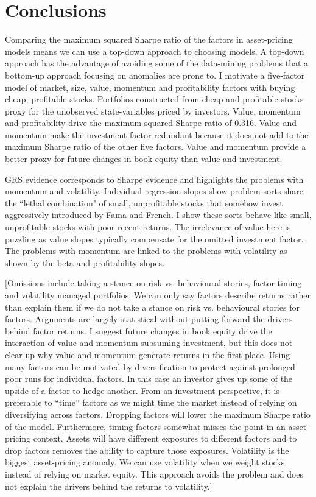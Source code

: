 
\section*{Conclusions}

Comparing the maximum squared Sharpe ratio of the factors in asset-pricing
models means we can use a top-down approach to choosing models.
A top-down approach has the advantage of avoiding some of the data-mining
problems that a bottom-up approach focusing on anomalies are prone to.
I motivate a five-factor model of market, size, value, momentum and
profitability factors with buying cheap, profitable stocks.
Portfolios constructed from cheap and profitable stocks proxy for the
unobserved state-variables priced by investors.
Value, momentum and profitability drive the maximum squared Sharpe ratio of
0.316.
Value and momentum make the investment factor redundant because it does not add
to the maximum Sharpe ratio of the other five factors.
Value and momentum provide a better proxy for future changes in book equity
than value and investment.

GRS evidence corresponds to Sharpe evidence and highlights the problems with
momentum and volatility.
Individual regression slopes show problem sorts share the ``lethal combination"
of small, unprofitable stocks that somehow invest aggressively introduced by
Fama and French.
I show these sorts behave like small, unprofitable stocks with poor recent
returns.
The irrelevance of value here is puzzling as value slopes typically
compensate for the omitted investment factor.
The problems with momentum are linked to the problems with volatility as shown
by the beta and profitability slopes.

[Omissions include taking a stance on risk vs. behavioural stories, factor
timing and volatility managed portfolios. We can only say factors describe
returns rather than explain them if we do not take a stance on risk vs.
behavioural stories for factors. Arguments are largely statistical without
putting forward the drivers behind factor returns. I suggest future changes in
book equity drive the interaction of value and momentum subsuming investment,
but this does not clear up why value and momentum generate returns in the first
place. Using many factors can be motivated by diversification to protect
against prolonged poor runs for individual factors. In this case an investor
gives up some of the upside of a factor to hedge another. From an investment
perspective, it is preferable to ``time” factors as we might time the market
instead of relying on diversifying across factors. Dropping factors will lower
the maximum Sharpe ratio of the model. Furthermore, timing factors somewhat
misses the point in an asset-pricing context. Assets will have different
exposures to different factors and to drop factors removes the ability to
capture those exposures. Volatility is the biggest asset-pricing anomaly. We
can use volatility when we weight stocks instead of relying on market equity.
This approach avoids the problem and does not explain the drivers behind the
returns to volatility.]

